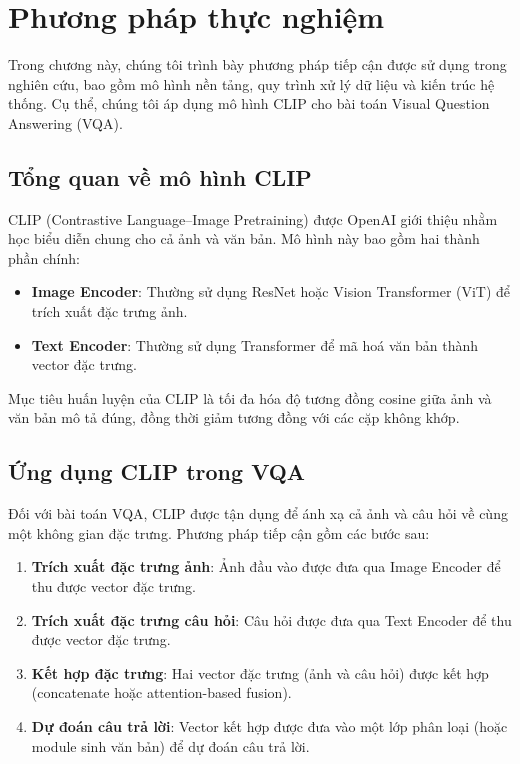 \chapter{Phương pháp thực nghiệm}
\label{chap:method}

Trong chương này, chúng tôi trình bày phương pháp tiếp cận được sử dụng trong nghiên cứu, bao gồm mô hình nền tảng, quy trình xử lý dữ liệu và kiến trúc hệ thống. Cụ thể, chúng tôi áp dụng mô hình CLIP cho bài toán Visual Question Answering (VQA). 

\section{Tổng quan về mô hình CLIP}
CLIP (Contrastive Language–Image Pretraining) được OpenAI giới thiệu nhằm học biểu diễn chung cho cả ảnh và văn bản. Mô hình này bao gồm hai thành phần chính:  
\begin{itemize}
    \item \textbf{Image Encoder}: Thường sử dụng ResNet hoặc Vision Transformer (ViT) để trích xuất đặc trưng ảnh.  
    \item \textbf{Text Encoder}: Thường sử dụng Transformer để mã hoá văn bản thành vector đặc trưng.  
\end{itemize}

Mục tiêu huấn luyện của CLIP là tối đa hóa độ tương đồng cosine giữa ảnh và văn bản mô tả đúng, đồng thời giảm tương đồng với các cặp không khớp.  

\section{Ứng dụng CLIP trong VQA}
Đối với bài toán VQA, CLIP được tận dụng để ánh xạ cả ảnh và câu hỏi về cùng một không gian đặc trưng. Phương pháp tiếp cận gồm các bước sau:  

\begin{enumerate}
    \item \textbf{Trích xuất đặc trưng ảnh}: Ảnh đầu vào được đưa qua Image Encoder để thu được vector đặc trưng.  
    \item \textbf{Trích xuất đặc trưng câu hỏi}: Câu hỏi được đưa qua Text Encoder để thu được vector đặc trưng.  
    \item \textbf{Kết hợp đặc trưng}: Hai vector đặc trưng (ảnh và câu hỏi) được kết hợp (concatenate hoặc attention-based fusion).  
    \item \textbf{Dự đoán câu trả lời}: Vector kết hợp được đưa vào một lớp phân loại (hoặc module sinh văn bản) để dự đoán câu trả lời.  
\end{enumerate}

